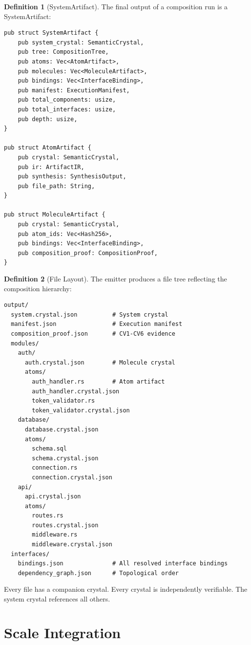 \documentclass[11pt,a4paper,twoside]{article}
\theoremstyle{definition}
\newtheorem{definition}{Definition}[section]
\theoremstyle{plain}
\theoremstyle{remark}
\begin{document}
\begin{definition}[SystemArtifact]\label{def:sysartifact}
The final output of a composition run is a SystemArtifact:
\begin{lstlisting}
pub struct SystemArtifact {
    pub system_crystal: SemanticCrystal,
    pub tree: CompositionTree,
    pub atoms: Vec<AtomArtifact>,
    pub molecules: Vec<MoleculeArtifact>,
    pub bindings: Vec<InterfaceBinding>,
    pub manifest: ExecutionManifest,
    pub total_components: usize,
    pub total_interfaces: usize,
    pub depth: usize,
}

pub struct AtomArtifact {
    pub crystal: SemanticCrystal,
    pub ir: ArtifactIR,
    pub synthesis: SynthesisOutput,
    pub file_path: String,
}

pub struct MoleculeArtifact {
    pub crystal: SemanticCrystal,
    pub atom_ids: Vec<Hash256>,
    pub bindings: Vec<InterfaceBinding>,
    pub composition_proof: CompositionProof,
}
\end{lstlisting}
\end{definition}

\begin{definition}[File Layout]\label{def:filelayout}
The emitter produces a file tree reflecting the composition hierarchy:
\begin{lstlisting}
output/
  system.crystal.json          # System crystal
  manifest.json                # Execution manifest
  composition_proof.json       # CV1-CV6 evidence
  modules/
    auth/
      auth.crystal.json        # Molecule crystal
      atoms/
        auth_handler.rs        # Atom artifact
        auth_handler.crystal.json
        token_validator.rs
        token_validator.crystal.json
    database/
      database.crystal.json
      atoms/
        schema.sql
        schema.crystal.json
        connection.rs
        connection.crystal.json
    api/
      api.crystal.json
      atoms/
        routes.rs
        routes.crystal.json
        middleware.rs
        middleware.crystal.json
  interfaces/
    bindings.json              # All resolved interface bindings
    dependency_graph.json      # Topological order
\end{lstlisting}
Every file has a companion crystal. Every crystal is independently
verifiable. The system crystal references all others.
\end{definition}


\part{Scale Integration}\label{part:scale}
\end{document}
